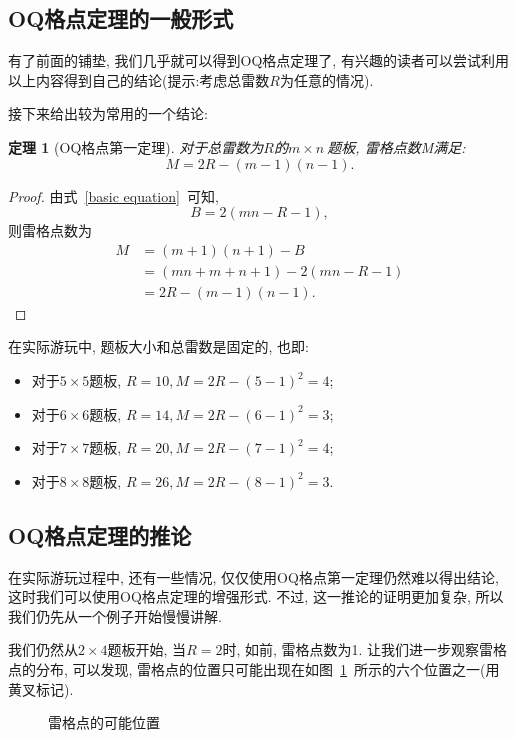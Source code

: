 \documentclass{ctexart}
\newcommand{\varible}[1]{{\Noto[#1]}}
\newcommand{\yellowcross}[2]{
    \begin{scope}[thick,color = yellow,shift={(#1,#2)}]
        \draw (0.05,-0.05) -- (-0.05,0.05);
        \draw (-0.05,-0.05) -- (0.05,0.05);
    \end{scope}
}
\newtheorem{theorem}{定理}
\begin{document}
\subsection{OQ格点定理的一般形式}
有了前面的铺垫, 我们几乎就可以得到OQ格点定理了, 有兴趣的读者可以尝试利用以上内容得到自己的结论(提示:考虑总雷数$R$为任意的情况).

接下来给出较为常用的一个结论:
\begin{theorem}[OQ格点第一定理]
    对于总雷数为$R$的$m\times n\ $\varible{O}\varible{Q}题板, 雷格点数M满足:
    \begin{equation}
        M = 2R - (m-1)(n-1).
    \end{equation}
    \label{OQ1}
\end{theorem}
\begin{proof}
    由式\ \ref{basic equation}\ 可知, 
    $$
    B = 2(mn - R -1),
    $$
    则雷格点数为
    \begin{align*}
        M &= (m+1)(n+1) - B \\
          &= (mn + m + n +1) -2(mn - R -1) \\
          &= 2R - (m-1)(n-1).
    \end{align*}
\end{proof}

在实际游玩中, 题板大小和总雷数是固定的, 也即:
\begin{itemize}
    \item 对于$5\times5$题板, $R = 10, M = 2R - (5-1)^2 = 4$;
    \item 对于$6\times6$题板, $R = 14, M = 2R - (6-1)^2 = 3$;
    \item 对于$7\times7$题板, $R = 20, M = 2R - (7-1)^2 = 4$;
    \item 对于$8\times8$题板, $R = 26, M = 2R - (8-1)^2 = 3$.
\end{itemize}

\subsection{OQ格点定理的推论}
在实际游玩过程中, 还有一些情况, 仅仅使用OQ格点第一定理仍然难以得出结论, 这时我们可以使用OQ格点定理的增强形式. 不过, 这一推论的证明更加复杂, 所以我们仍先从一个例子开始慢慢讲解.

我们仍然从$2\times4$题板开始, 当$R = 2$时, 如前, 雷格点数为1. 让我们进一步观察雷格点的分布, 可以发现, 雷格点的位置只可能出现在如图\ \ref{example2}\ 所示的六个位置之一(用黄叉标记).
\begin{figure}[ht]
    \centering
    \caption{雷格点的可能位置}
    \label{example2}
\end{figure}
\end{document}
